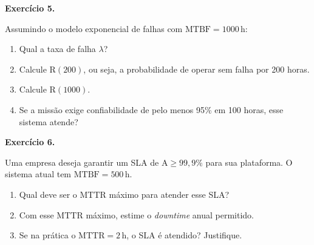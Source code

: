 \documentclass[12pt,a4paper]{article}
\newif\ifgabarito
\newcommand{\R}{\mathrm{R}}
\newcommand{\A}{\mathrm{A}}
\newcommand{\MTBF}{\mathrm{MTBF}}
\newcommand{\MTTR}{\mathrm{MTTR}}
\newcommand{\questao}[2][8]{%
  \needspace{#1\baselineskip}%
  \noindent\textbf{Exercício #2.}%
}
\begin{document}
\vspace{8pt}

\questao[8]{5}
Assumindo o modelo exponencial de falhas com $\MTBF = 1000\,\text{h}$:
\begin{enumerate}[label=\alph*)]
  \item Qual a taxa de falha $\lambda$?
  \item Calcule $\R(200)$, ou seja, a probabilidade de operar sem falha por 200 horas.
  \item Calcule $\R(1000)$.
  \item Se a missão exige confiabilidade de pelo menos 95\% em 100 horas, esse sistema atende?
\end{enumerate}

\ifgabarito
\begin{tcolorbox}[gabarito]
\begin{enumerate}[label=\alph*),nosep]
  \item $\lambda = 1/1000 = \mathbf{0{,}001\,\text{falhas/h}}$.
  \item $\R(200) = e^{-0{,}2} \approx \mathbf{81{,}9\%}$.
  \item $\R(1000) = e^{-1} \approx \mathbf{36{,}8\%}$.
  \item $\R(100) = e^{-0{,}1} \approx 90{,}5\% < 95\%$ \textbf{--- não atende}.
\end{enumerate}
\end{tcolorbox}
\fi

\vspace{8pt}

\questao[8]{6}
Uma empresa deseja garantir um SLA de $\A \geq 99{,}9\%$ para sua plataforma. O sistema atual tem $\MTBF = 500\,\text{h}$.
\begin{enumerate}[label=\alph*)]
  \item Qual deve ser o $\MTTR$ máximo para atender esse SLA?
  \item Com esse $\MTTR$ máximo, estime o \textit{downtime} anual permitido.
  \item Se na prática o $\MTTR = 2\,\text{h}$, o SLA é atendido? Justifique.
\end{enumerate}

\ifgabarito
\begin{tcolorbox}[gabarito]
\begin{enumerate}[label=\alph*),nosep]
  \item $500/(500+\MTTR) \geq 0{,}999 \Rightarrow \MTTR \leq 0{,}5/0{,}999 \approx \mathbf{0{,}5\,\text{h}}$ (30 min).
  \item Downtime anual permitido: $0{,}001 \times 8760 \approx \mathbf{8{,}76\,\text{h/ano}}$.
  \item $\A = 500/502 \approx 99{,}60\% < 99{,}9\%$ --- \textbf{SLA não atendido}.
\end{enumerate}
\end{tcolorbox}
\fi
\end{document}
